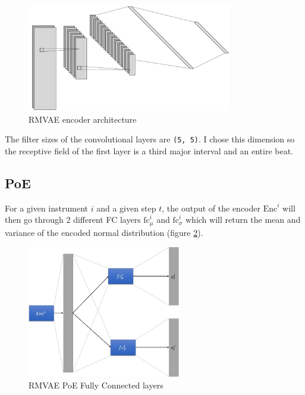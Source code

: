 \documentclass[12pt]{report}
\begin{document}
\begin{figure}[h]
    \centering
    \includegraphics[width=0.8\textwidth]{images/nn/architectures/rmvae/encoder.jpg}
    \caption{RMVAE encoder architecture}
    \label{fig:rmvae_encoder}
\end{figure}

The filter sizes of the convolutional layers are \texttt{(5, 5)}.
I chose this dimension so the receptive field of the first layer is a third major interval and an entire beat.

\subsection{PoE}

For a given instrument $i$ and a given step $t$, the output of the encoder $\text{Enc}^i$ will then go through 2 different FC layers $\text{fc}^i_\mu$ and $\text{fc}^i_\sigma$ which will return the mean and variance of the encoded normal distribution (figure \ref{fig:rmvae_poe_fc}).

\begin{figure}[h]
    \centering
    \includegraphics[width=0.6\textwidth]{images/nn/architectures/rmvae/poe_fc.jpg}
    \caption{RMVAE PoE Fully Connected layers}
    \label{fig:rmvae_poe_fc}
\end{figure}
\end{document}

